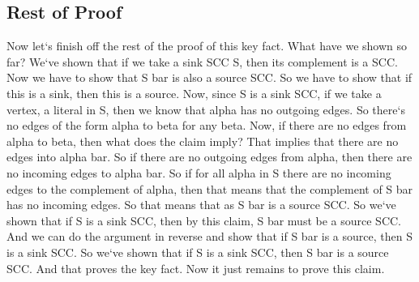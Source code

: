 \subsection{Rest of Proof}
Now let`s finish off the rest of the proof of this key fact.
What have we shown so far? We`ve shown that if we take a sink SCC S, then its complement is a SCC\@.
Now we have to show that S bar is also a source SCC\@.
So we have to show that if this is a sink, then this is a source.
Now, since S is a sink SCC, if we take a vertex, a literal in S, then we know that alpha has no outgoing edges.
So there`s no edges of the form alpha to beta for any beta.
Now, if there are no edges from alpha to beta, then what does the claim imply? That implies that there are no edges into alpha bar.
So if there are no outgoing edges from alpha, then there are no incoming edges to alpha bar.
So if for all alpha in S there are no incoming edges to the complement of alpha, then that means that the complement of S bar has no incoming edges.
So that means that as S bar is a source SCC\@.
So we`ve shown that if S is a sink SCC, then by this claim, S bar must be a source SCC\@.
And we can do the argument in reverse and show that if S bar is a source, then S is a sink SCC\@.
So we`ve shown that if S is a sink SCC, then S bar is a source SCC\@.
And that proves the key fact.
Now it just remains to prove this claim.

